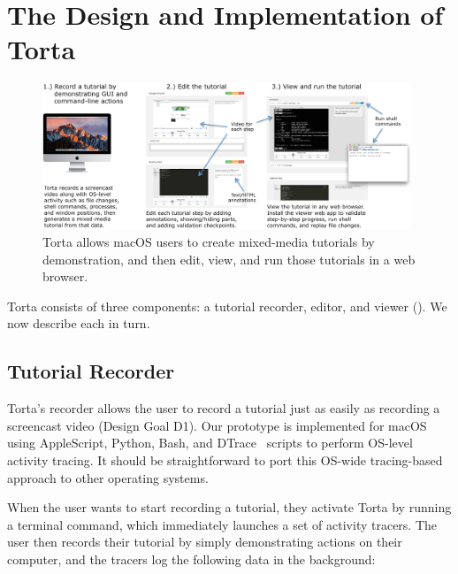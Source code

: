 


\section{The Design and Implementation of Torta}

\begin{figure}[h!]
\centering
\includegraphics[width=0.98\textwidth]{figures/torta/torta-overview.png}

\caption{Torta allows macOS users to create mixed-media tutorials
by demonstration, and then edit, view, and run those tutorials in a web
browser.}

\label{fig:torta-overview}
\end{figure}

Torta consists of three components: a tutorial recorder, editor, and
viewer (). We now describe each in turn.


\subsection{Tutorial Recorder}

Torta's recorder allows the user to record a tutorial just as easily as
recording a screencast video (Design Goal D1).
%
Our prototype is implemented for macOS using AppleScript, Python, Bash,
and DTrace~\cite{Cantrill2004} scripts to perform OS-level activity tracing. It
should be straightforward to port this OS-wide tracing-based approach to other
operating systems.


When the user wants to start recording a tutorial, they activate Torta
by running a terminal command, which immediately launches a set of
activity tracers. The user then records their tutorial by simply
demonstrating actions on their computer, and the tracers log the
following data in the background:

